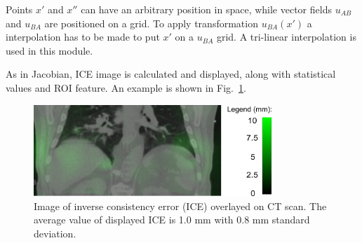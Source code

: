 \documentclass[type=dr, dr=rernat, accentcolor=tud7b,colorbacktitle, bigchapter, openright, twoside, 12pt ]{tudthesis}
\begin{document}
Points $x'$ and $x''$ can have an arbitrary position in space, while vector fields $u_{AB}$ and $u_{BA}$ are positioned on a grid. To apply transformation $u_{BA}(x')$ a interpolation has to be made to put $x'$ on a $u_{BA}$ grid. A tri-linear interpolation is used in this module.

As in Jacobian, ICE image is calculated and displayed, along with statistical values and ROI feature. An example is shown in Fig.~\ref{inv}.




\begin{figure}[H]
\begin{center}
\includegraphics[width=0.8\textwidth]{./Images/inv.png}
\caption{Image of inverse consistency error (ICE) overlayed on CT scan. The average value of displayed ICE is 1.0 mm with 0.8 mm standard deviation.}
\label{inv}
\end{center}
\end{figure}


% 
\end{document}

